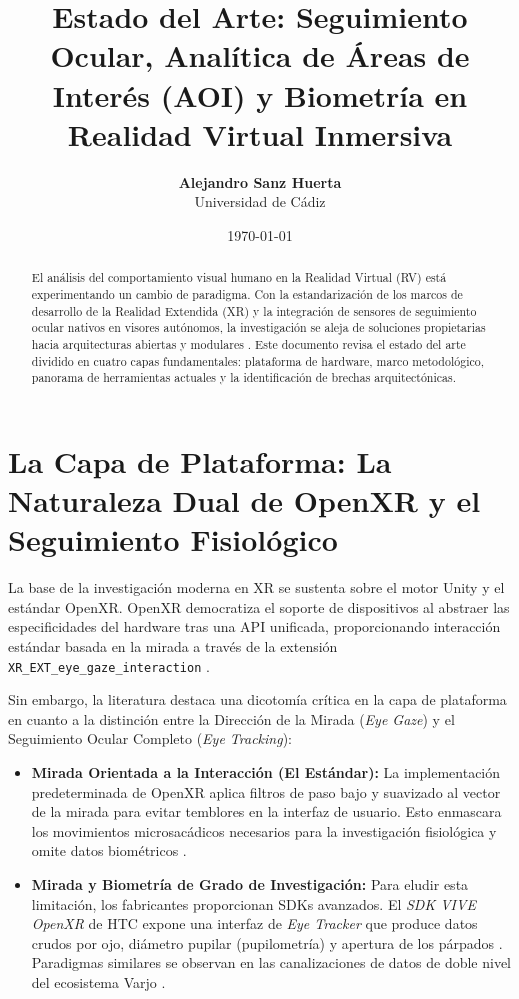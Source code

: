 \documentclass[12pt,a4paper]{article}
\title{Estado del Arte: Seguimiento Ocular, Analítica de Áreas de Interés (AOI) y Biometría en Realidad Virtual Inmersiva}
\author{
    \textbf{Alejandro Sanz Huerta} \\
    Universidad de Cádiz
}
\date{\today}
\begin{document}
\maketitle

\begin{abstract}
    El análisis del comportamiento visual humano en la Realidad Virtual (RV) está experimentando un cambio de paradigma. Con la estandarización de los marcos de desarrollo de la Realidad Extendida (XR) y la integración de sensores de seguimiento ocular nativos en visores autónomos, la investigación se aleja de soluciones propietarias hacia arquitecturas abiertas y modulares \cite{clay2019}. Este documento revisa el estado del arte dividido en cuatro capas fundamentales: plataforma de hardware, marco metodológico, panorama de herramientas actuales y la identificación de brechas arquitectónicas.
\end{abstract}

\section{La Capa de Plataforma: La Naturaleza Dual de OpenXR y el Seguimiento Fisiológico}

La base de la investigación moderna en XR se sustenta sobre el motor Unity y el estándar OpenXR. OpenXR democratiza el soporte de dispositivos al abstraer las especificidades del hardware tras una API unificada, proporcionando interacción estándar basada en la mirada a través de la extensión \texttt{XR\_EXT\_eye\_gaze\_interaction} \cite{khronos_openxr}.

Sin embargo, la literatura destaca una dicotomía crítica en la capa de plataforma en cuanto a la distinción entre la Dirección de la Mirada (\textit{Eye Gaze}) y el Seguimiento Ocular Completo (\textit{Eye Tracking}):

\begin{itemize}
    \item \textbf{Mirada Orientada a la Interacción (El Estándar):} La implementación predeterminada de OpenXR aplica filtros de paso bajo y suavizado al vector de la mirada para evitar temblores en la interfaz de usuario. Esto enmascara los movimientos microsacádicos necesarios para la investigación fisiológica y omite datos biométricos \cite{khronos_openxr}.
    \item \textbf{Mirada y Biometría de Grado de Investigación:} Para eludir esta limitación, los fabricantes proporcionan SDKs avanzados. El \textit{SDK VIVE OpenXR} de HTC expone una interfaz de \textit{Eye Tracker} que produce datos crudos por ojo, diámetro pupilar (pupilometría) y apertura de los párpados \cite{htc_sdk}. Paradigmas similares se observan en las canalizaciones de datos de doble nivel del ecosistema Varjo \cite{varjo_sdk}.
\end{itemize}
\end{document}
